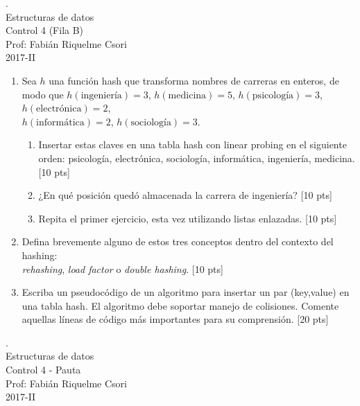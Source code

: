 \documentclass[letter,12pt,oneside]{book}
\theoremstyle{definition}
\begin{document}
\begin{center}
 {\Large
  {\color{white}.}\\
  Estructuras de datos\\[1ex]
  Control 4 (Fila B)}\\[1.2ex]
  Prof: Fabián Riquelme Csori\\
  2017-II
\end{center}

\begin{enumerate}
    \item Sea $h$ una función hash que transforma nombres de carreras en enteros, de modo que $h(\mbox{ingeniería})=3$, $h(\mbox{medicina})=5$, $h(\mbox{psicología})=3$, $h(\mbox{electrónica})=2$,\\ $h(\mbox{informática})=2$, $h(\mbox{sociología})=3$.
    \begin{enumerate}
        \item Insertar estas claves en una tabla hash con linear probing en el siguiente orden: psicología, electrónica, sociología, informática, ingeniería, medicina. \tabto{76ex} [10 pts]
        \item ¿En qué posición quedó almacenada la carrera de ingeniería? \tabto{76ex} [10 pts]
        \item Repita el primer ejercicio, esta vez utilizando listas enlazadas. \tabto{76ex} [10 pts]
    \end{enumerate}
    \item Defina brevemente alguno de estos tres conceptos dentro del contexto del hashing:\\ {\em rehashing}, {\em load factor} o {\em double hashing}. \tabto{81ex} [10 pts]
    \item Escriba un pseudocódigo de un algoritmo para insertar un par (key,value) en una tabla hash. El algoritmo debe soportar manejo de colisiones. Comente aquellas líneas de código más importantes para su comprensión. \tabto{81ex} [20 pts]
\end{enumerate}

\newpage

\begin{center}
 {\Large
  {\color{white}.}\\
  Estructuras de datos\\[1ex]
  Control 4 - Pauta}\\[1.2ex]
  Prof: Fabián Riquelme Csori\\
  2017-II
\end{center}
\end{document}
